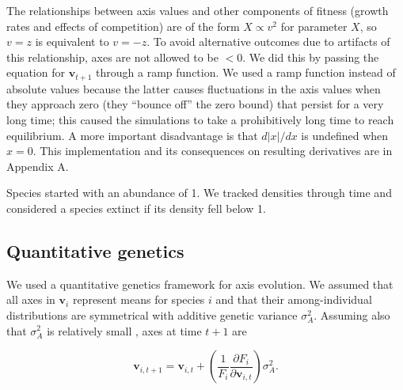 The relationships between axis values and other components of fitness
(growth rates and effects of competition) are of the form
$X \propto v^2$ for parameter $X$, so $v = z$ is equivalent to $v = -z$.
To avoid alternative outcomes due to artifacts of this relationship,
axes are not allowed to be $< 0$.
We did this by passing the equation for $\mathbf{v}_{t+1}$ through a
ramp function.
We used a ramp function instead of absolute values
because the latter causes fluctuations
in the axis values when they approach zero (they ``bounce off''
the zero bound) that persist for a very long time;
this caused the simulations to take a prohibitively long time to reach
equilibrium.
A more important disadvantage is that $d \lvert x \rvert / dx$ is
undefined when $x = 0$.
This implementation and its consequences on resulting derivatives are in
Appendix A.

Species started with an abundance of 1.
We tracked densities through time and considered a species extinct if its 
density fell below 1.



%


\subsection*{Quantitative genetics}

We used a quantitative genetics framework for axis evolution.
We assumed that all axes in $\mathbf{v}_i$ represent means for species $i$
and that their among-individual distributions are symmetrical with additive
genetic variance $\sigma^2_A$.
Assuming also that $\sigma^2_A$ is relatively small
\citep{Iwasa1991a,Abrams2001a,Abrams1993b}, 
axes at time $t+1$ are

\begin{equation} \label{eq:axis-change}
    \mathbf{v}_{i,t+1} = \mathbf{v}_{i,t} + \left( \frac{1}{F_i}
        \frac{\partial F_i}{\partial \mathbf{v}_{i,t}} \right) \sigma^2_A
    \textrm{.}
\end{equation}

